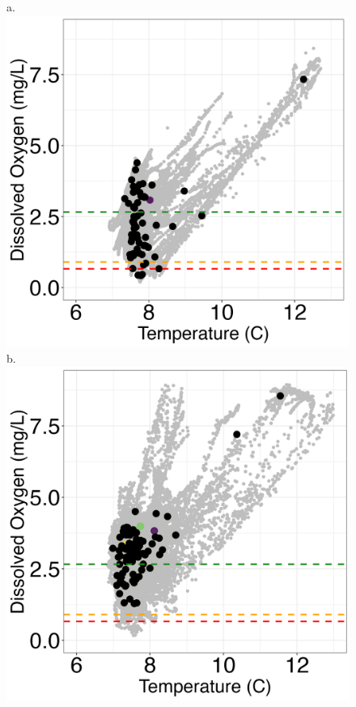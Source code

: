 \documentclass[12pt,twoside]{reedthesis}
\begin{document}
	\begin{figure}[!h]
		\begin{center}
			a. \includegraphics[scale=0.4]{Scatter_ex}
			b. \includegraphics[scale=0.4]{Scatter_ex_Mod}

\end{center}
\end{figure}
\end{document}
